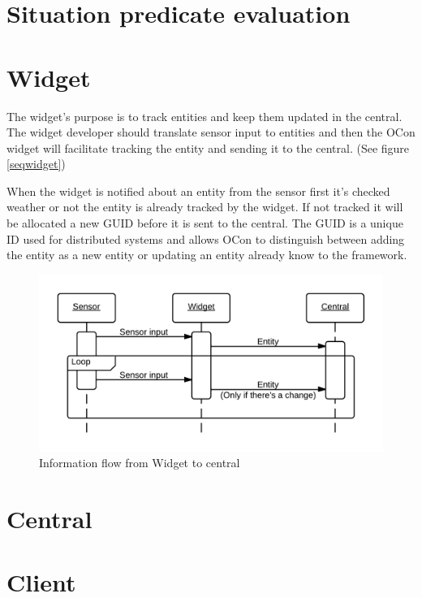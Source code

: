 \documentclass[../report.tex]{subfiles}
\begin{document}
\section{Situation predicate evaluation}

\section{Widget}

The widget's purpose is to track entities and keep them updated in the central. The widget developer should translate sensor input to entities and then the OCon widget will facilitate tracking the entity and sending it to the central. (See figure \ref{seqwidget})

When the widget is notified about an entity from the sensor first it's checked weather or not the entity is already tracked by the widget. If not tracked it will be allocated a new GUID before it is sent to the central. The GUID is a unique ID used for distributed systems and allows OCon to distinguish between adding the entity as a new entity or updating an entity already know to the framework.

\begin{figure}[h]
\centering
\includegraphics[width=\linewidth]{sequencediagram-widget.png}
\caption{Information flow from Widget to central}
\label{fig:seqwidget}
\end{figure}


\section{Central}

\section{Client}
\end{document}
